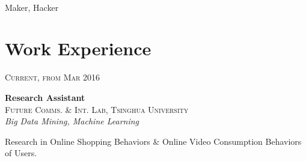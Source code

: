 \documentclass[10pt]{article} %
\begin{document}
\color{text1} %


\par{\\ %
{\color{headings} Maker, Hacker}\\[5pt]

	

\begin{minipage}[t]{0.5\textwidth} %
\vspace{0pt} %
	

\section{Work Experience} 


{\raggedleft\textsc{Current, from Mar 2016}\par}

{\raggedright\large \textbf{Research Assistant} \\ \textsc{Future Comms. \& Int. Lab, Tsinghua University}
\\
\textit{Big Data Mining, Machine Learning}\\[5pt]}

\normalsize{Research in Online Shopping Behaviors \& Online Video Consumption Behaviors of Users.}\\



\end{minipage}}
\end{document}
